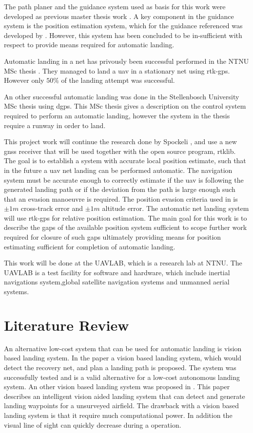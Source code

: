 The path planer and the guidance system used as basis for this work were developed as previous master thesis work \citep{Froelich}. A key component in the guidance system is the position estimation system, which for the guidance referenced was developed by \citep{Spockeli}. However, this system has been concluded to be in-sufficient with respect to provide means required for automatic landing.

Automatic landing in a net has privously been successful performed in the NTNU MSc thesis \citep{Skulstad&Syversen}. They managed to land a \gls{uav} in a stationary net using \gls{rtk-gps}. However only $50\%$ of the landing attempt was successful. 

An other successful automatic landing was done in the Stellenbosch University MSc thesis \citep{smit2013autonomous} using \acrfull{dgps}. This MSc thesis gives a description on the control system required to perform an automatic landing, however the system in the thesis require a runway in order to land.

This project work will continue the research done by Spockeli \citep{Spockeli}, and use a new \gls{gnss} receiver that will be used together with the open source program, \gls{rtklib}. The goal is to establish a system with accurate local position estimate, such that in the future a \gls{uav} net landing can be performed automatic. The navigation system must be accurate enough to correctly estimate if the \gls{uav} is following the generated landing path or if the deviation from the path is large enough such that an evasion manoeuvre is required. The position evasion criteria used in \citep{Froelich} is $\pm1m$ cross-track error and $\pm1m$ altitude error.
The automatic net landing system will use \gls{rtk-gps} for relative position estimation. The main goal for this work is to describe the gaps of the available position system sufficient to scope further work required for closure of such gaps ultimately providing means for position estimating sufficient for completion of automatic landing.

This work will be done at the UAVLAB, which is a research lab at NTNU. The UAVLAB is a test facility for software and hardware, which include inertial navigations system,global satellite navigation systems and unmanned aerial systems.
\section{Literature Review}
 
An alternative low-cost system that can be used for automatic landing is vision based landing system. In the paper \citep{kim2013fully} a vision based landing system, which would detect the recovery net, and plan a landing path is proposed. The system was successfully tested and is a valid alternative for a low-cost autonomous landing system. An other vision based landing system was proposed in \citep{williams2012intelligent}. This paper describes an intelligent vision aided landing system that can detect and generate landing waypoints for a unsurveyed airfield. The drawback with a vision based landing system is that it require much computational power. In addition the visual line of sight can quickly decrease during a operation.

